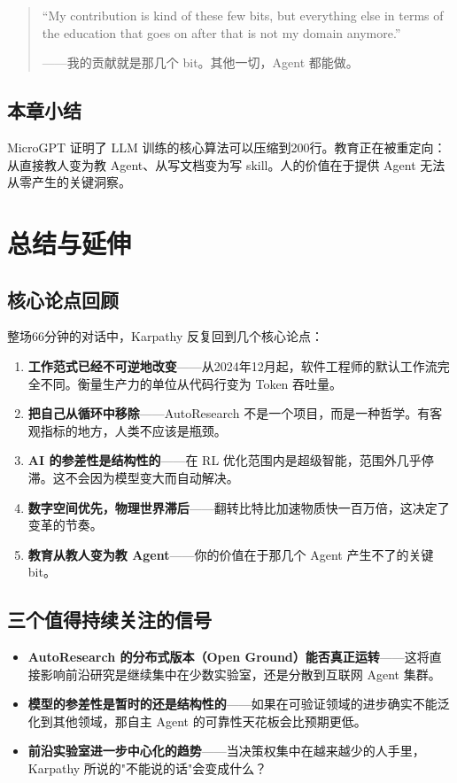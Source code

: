\documentclass[a4paper]{article}
\begin{document}
\begin{quote}
``My contribution is kind of these few bits, but everything else in terms of the education that goes on after that is not my domain anymore.''

——我的贡献就是那几个 bit。其他一切，Agent 都能做。
\end{quote}

\subsection{本章小结}

MicroGPT 证明了 LLM 训练的核心算法可以压缩到200行。教育正在被重定向：从直接教人变为教 Agent、从写文档变为写 skill。人的价值在于提供 Agent 无法从零产生的关键洞察。


\section{总结与延伸}

\subsection{核心论点回顾}

整场66分钟的对话中，Karpathy 反复回到几个核心论点：

\begin{enumerate}
    \item \textbf{工作范式已经不可逆地改变}——从2024年12月起，软件工程师的默认工作流完全不同。衡量生产力的单位从代码行变为 Token 吞吐量。
    \item \textbf{把自己从循环中移除}——AutoResearch 不是一个项目，而是一种哲学。有客观指标的地方，人类不应该是瓶颈。
    \item \textbf{AI 的参差性是结构性的}——在 RL 优化范围内是超级智能，范围外几乎停滞。这不会因为模型变大而自动解决。
    \item \textbf{数字空间优先，物理世界滞后}——翻转比特比加速物质快一百万倍，这决定了变革的节奏。
    \item \textbf{教育从教人变为教 Agent}——你的价值在于那几个 Agent 产生不了的关键 bit。
\end{enumerate}

\subsection{三个值得持续关注的信号}

\begin{itemize}
    \item \textbf{AutoResearch 的分布式版本（Open Ground）能否真正运转}——这将直接影响前沿研究是继续集中在少数实验室，还是分散到互联网 Agent 集群。
    \item \textbf{模型的参差性是暂时的还是结构性的}——如果在可验证领域的进步确实不能泛化到其他领域，那自主 Agent 的可靠性天花板会比预期更低。
    \item \textbf{前沿实验室进一步中心化的趋势}——当决策权集中在越来越少的人手里，Karpathy 所说的"不能说的话"会变成什么？
\end{itemize}
\end{document}
